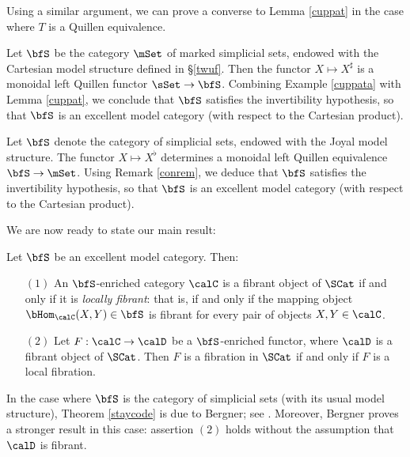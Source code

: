 \begin{remark}\label{conrem}
Using a similar argument, we can prove a converse to Lemma \ref{cuppat} in the case where
$T$ is a Quillen equivalence.
\end{remark}

\begin{example}\label{supermat}
Let $\bfS$ be the category $\mSet$ of marked simplicial sets, endowed with
the Cartesian model structure defined in \S \ref{twuf}. Then the functor
$X \mapsto X^{\sharp}$ is a monoidal left Quillen functor 
$\sSet \rightarrow \bfS$. Combining Example \ref{cuppata} with Lemma \ref{cuppat}, we
conclude that $\bfS$ satisfies the invertibility hypothesis, so that $\bfS$ is an excellent model category (with respect to the Cartesian product).
\end{example}

\begin{example}
Let $\bfS$ denote the category of simplicial sets, endowed with the Joyal model structure.
The functor $X \mapsto X^{\flat}$ determines a monoidal left Quillen equivalence
$\bfS \rightarrow \mSet$. Using Remark \ref{conrem}, we deduce that $\bfS$ satisfies the invertibility hypothesis, so that $\bfS$ is an excellent model category (with respect to the Cartesian product).
\end{example}

We are now ready to state our main result:

\begin{theorem}\label{staycode}
Let $\bfS$ be an excellent model category.
Then:
\begin{itemize}
\item[$(1)$] An $\bfS$-enriched category $\calC$ is a fibrant object of $\SCat$ if and only if it is {\em locally fibrant}: that is, if and only if the mapping object $\bHom_{\calC}(X,Y) \in \bfS$ is fibrant for
every pair of objects $X,Y \in \calC$. 
\item[$(2)$] Let $F: \calC \rightarrow \calD$ be a $\bfS$-enriched functor, where $\calD$ is a
fibrant object of $\SCat$. Then $F$ is a fibration in $\SCat$ if and only if $F$ is a local fibration.
\end{itemize}
\end{theorem}

\begin{remark}
In the case where $\bfS$ is the category of simplicial sets (with its usual model structure),
Theorem \ref{staycode} is due to Bergner; see \cite{bergner}. Moreover, Bergner
proves a stronger result in this case: assertion $(2)$ holds without the assumption that
$\calD$ is fibrant.
\end{remark}


